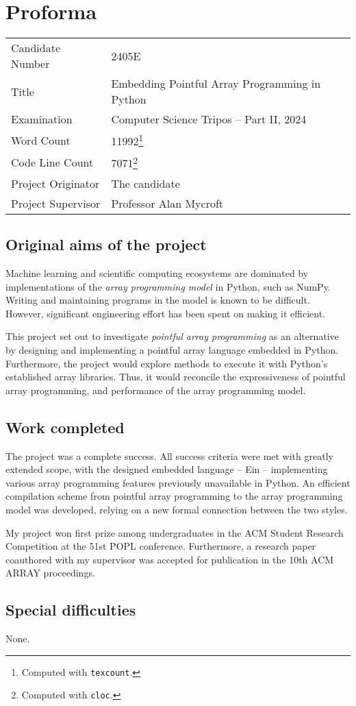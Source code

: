 \section*{Proforma}
\begin{tabular}{ll}
    Candidate Number & 2405E \\
    Title & Embedding Pointful Array Programming in Python \\ 
    Examination & Computer Science Tripos -- Part II, 2024 \\
    Word Count & 11992\footnote{Computed with \texttt{texcount}.} \\
    Code Line Count & 7071\footnote{Computed with \texttt{cloc}.} \\
    Project Originator & The candidate \\
    Project Supervisor & Professor Alan Mycroft \\
\end{tabular}

\subsection*{Original aims of the project}
Machine learning and scientific computing ecosystems are dominated by implementations of the \textit{array programming model} in Python, such as NumPy.
Writing and maintaining programs in the model is known to be difficult.
However, significant engineering effort has been spent on making it efficient.

This project set out to investigate \textit{pointful array programming} as an alternative by designing and implementing a pointful array language embedded in Python. 
Furthermore, the project would explore methods to execute it with Python's established array libraries. 
Thus, it would reconcile the expressiveness of pointful array programming, and performance of the array programming model.

\subsection*{Work completed}

The project was a complete success. All success criteria were met with greatly extended scope, with the designed embedded language -- Ein -- implementing various array programming features previously unavailable in Python. An efficient compilation scheme from pointful array programming to the array programming model was developed, relying on a new formal connection between the two styles. 

My project won first prize among undergraduates in the ACM Student Research Competition at the 51st POPL conference. Furthermore, a research paper coauthored with my supervisor was accepted for publication in the 10th ACM ARRAY proceedings.

\subsection*{Special difficulties}
None.
